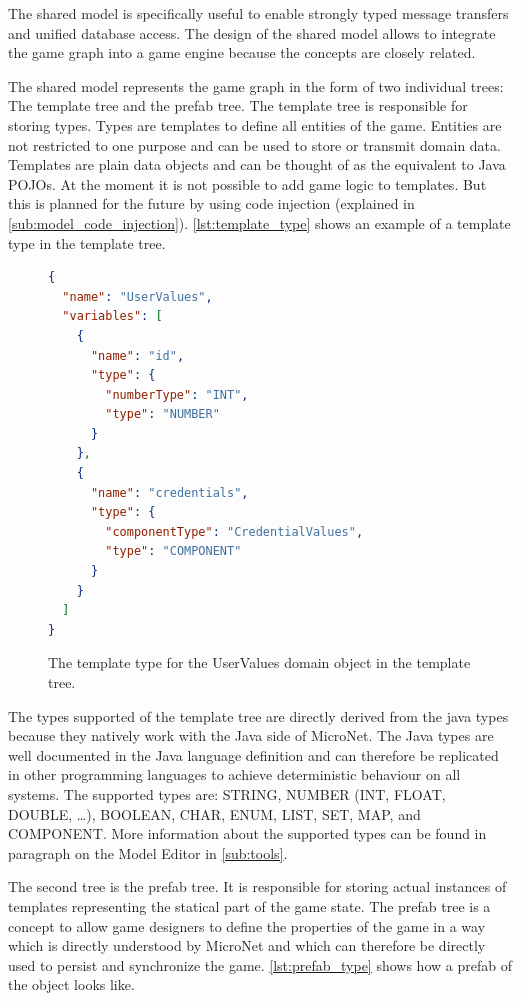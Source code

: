 The shared model is specifically useful to enable strongly typed message
transfers and unified database access. The design of the shared model allows to
integrate the game graph into a game engine because the concepts are closely
related.

The shared model represents the game graph in the form of two individual trees:
The template tree and the prefab tree. The template tree is responsible for
storing types. Types are templates to define all entities of the game. Entities
are not restricted to one purpose and can be used to store or transmit domain
data. Templates are plain data objects and can be thought of as the equivalent
to Java POJOs. At the moment it is not possible to add game logic to templates.
But this is planned for the future by using code injection (explained in
\autoref{sub:model_code_injection}). \autoref{lst:template_type} shows an
example of a template type in the template tree.

\begin{figure}
\begin{lstlisting}[language=json,firstnumber=1] 
{
  "name": "UserValues",
  "variables": [
    {
      "name": "id",
      "type": {
        "numberType": "INT",
        "type": "NUMBER"
      }
    },
    {
      "name": "credentials",
      "type": {
        "componentType": "CredentialValues",
        "type": "COMPONENT"
      }
    }
  ]
}
\end{lstlisting}
\caption{The template type for the UserValues domain object in the template
tree.}
\label{lst:template_type}
\end{figure}

The types supported of the template tree are directly derived from the java
types because they natively work with the Java side of MicroNet. The Java types
are well documented in the Java language definition and can therefore be
replicated in other programming languages to achieve deterministic behaviour on
all systems.
The supported types are: STRING, NUMBER (INT, FLOAT, DOUBLE, \ldots), BOOLEAN,
CHAR, ENUM, LIST, SET, MAP, and COMPONENT. More information about the supported
types can be found in paragraph on the Model Editor in \autoref{sub:tools}.

The second tree is the prefab tree. It is responsible for storing actual
instances of templates representing the statical part of the game state. The
prefab tree is a concept to allow game designers to define the properties of the
game in a way which is directly understood by MicroNet and which can therefore
be directly used to persist and synchronize the game. \autoref{lst:prefab_type}
shows how a prefab of the  object looks like.

